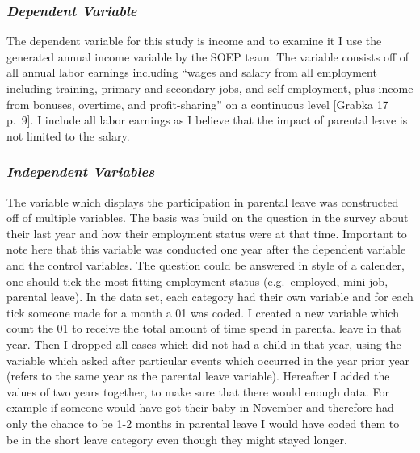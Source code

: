 \documentclass[
  12pt,
]{article}
\begin{document}
\hypertarget{dependent-variable}{%
\subsubsection*{\texorpdfstring{\emph{Dependent Variable}}{Dependent Variable}}\label{dependent-variable}}

The dependent variable for this study is income and to examine it I use the generated annual income variable by the SOEP team. The variable consists off of all annual labor earnings including ``wages and salary from all employment including training, primary and secondary jobs, and self-employment, plus income from bonuses, overtime, and profit-sharing'' on a continuous level {[}Grabka 17 p.~9{]}. I include all labor earnings as I believe that the impact of parental leave is not limited to the salary.

\hypertarget{independent-variables}{%
\subsubsection*{\texorpdfstring{\emph{Independent Variables}}{Independent Variables}}\label{independent-variables}}

The variable which displays the participation in parental leave was constructed off of multiple variables. The basis was build on the question in the survey about their last year and how their employment status were at that time. Important to note here that this variable was conducted one year after the dependent variable and the control variables. The question could be answered in style of a calender, one should tick the most fitting employment status (e.g.~employed, mini-job, parental leave). In the data set, each category had their own variable and for each tick someone made for a month a 01 was coded. I created a new variable which count the 01 to receive the total amount of time spend in parental leave in that year. Then I dropped all cases which did not had a child in that year, using the variable which asked after particular events which occurred in the year prior year (refers to the same year as the parental leave variable). Hereafter I added the values of two years together, to make sure that there would enough data. For example if someone would have got their baby in November and therefore had only the chance to be 1-2 months in parental leave I would have coded them to be in the short leave category even though they might stayed longer.
\end{document}
